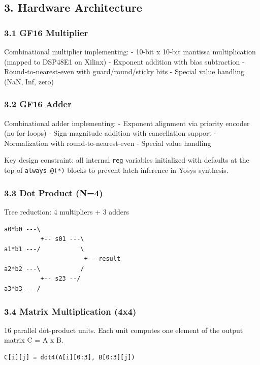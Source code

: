 \documentclass[
]{article}
\begin{document}
\subsection{3. Hardware Architecture}\label{hardware-architecture}

\subsubsection{3.1 GF16 Multiplier}\label{gf16-multiplier}

Combinational multiplier implementing: - 10-bit x 10-bit mantissa
multiplication (mapped to DSP48E1 on Xilinx) - Exponent addition with
bias subtraction - Round-to-nearest-even with guard/round/sticky bits -
Special value handling (NaN, Inf, zero)

\subsubsection{3.2 GF16 Adder}\label{gf16-adder}

Combinational adder implementing: - Exponent alignment via priority
encoder (no for-loops) - Sign-magnitude addition with cancellation
support - Normalization with round-to-nearest-even - Special value
handling

Key design constraint: all internal \texttt{reg} variables initialized
with defaults at the top of \texttt{always\ @(*)} blocks to prevent
latch inference in Yosys synthesis.

\subsubsection{3.3 Dot Product (N=4)}\label{dot-product-n4}

Tree reduction: 4 multipliers + 3 adders

\begin{verbatim}
a0*b0 ---\
          +-- s01 ---\
a1*b1 ---/           \
                      +-- result
a2*b2 ---\           /
          +-- s23 --/
a3*b3 ---/
\end{verbatim}

\subsubsection{3.4 Matrix Multiplication
(4x4)}\label{matrix-multiplication-4x4}

16 parallel dot-product units. Each unit computes one element of the
output matrix C = A x B.

\begin{verbatim}
C[i][j] = dot4(A[i][0:3], B[0:3][j])
\end{verbatim}
\end{document}
